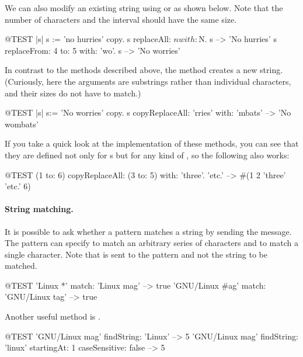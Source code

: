 \documentclass[a4paper,10pt,twoside]{book}
\begin{document}
We can also modify an existing string using  or  as shown below. Note that the number of characters and the interval should have the same size.

\begin{code}{@TEST |s| s := 'no hurries' copy.}
s replaceAll: $n with: $N.
s --> 'No hurries'
s replaceFrom: 4 to: 5 with: 'wo'.
s --> 'No worries'
\end{code}

In contrast to the methods described above, the method  creates a new string.
(Curiously, here the arguments are substrings rather than individual characters, and their sizes do not have to match.)

\begin{code}{@TEST |s| s:= 'No worries' copy.}
s copyReplaceAll: 'rries' with: 'mbats' --> 'No wombats'
\end{code}

If you take a quick look at the implementation of these methods, you can see that they are defined not only for s but for any kind of , so the following also works:

\begin{code}{@TEST}
(1 to: 6) copyReplaceAll: (3 to: 5) with: { 'three'. 'etc.' } --> #(1 2 'three' 'etc.' 6)
\end{code}

\paragraph{String matching.}
It is possible to ask whether a pattern matches a string by sending the  message.
The pattern can specify \ct{*} to match an arbitrary series of characters and \ct{\#} to match a single character.
Note that  is sent to the pattern and not the string to be matched.
\begin{code}{@TEST}
'Linux *' match: 'Linux mag'                      --> true
'GNU/Linux #ag' match: 'GNU/Linux tag' --> true
\end{code}

Another useful method is .
\begin{code}{@TEST}
'GNU/Linux mag' findString: 'Linux'                                                      --> 5
'GNU/Linux mag' findString: 'linux' startingAt: 1 caseSensitive: false  --> 5
\end{code}
\end{document}
